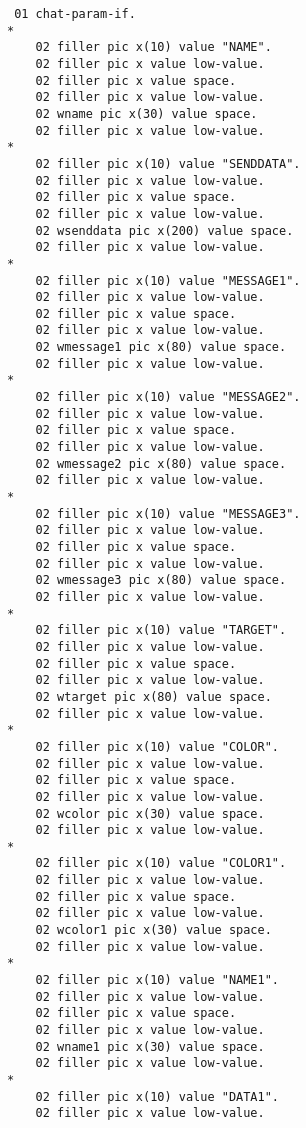 {{{\footnotesize
\begin{verbatim}
       01 chat-param-if.
      *
          02 filler pic x(10) value "NAME".
          02 filler pic x value low-value.
          02 filler pic x value space.
          02 filler pic x value low-value.
          02 wname pic x(30) value space.
          02 filler pic x value low-value.
      *    
          02 filler pic x(10) value "SENDDATA".
          02 filler pic x value low-value.
          02 filler pic x value space.
          02 filler pic x value low-value.
          02 wsenddata pic x(200) value space.
          02 filler pic x value low-value.
      *    
          02 filler pic x(10) value "MESSAGE1".
          02 filler pic x value low-value.
          02 filler pic x value space.
          02 filler pic x value low-value.
          02 wmessage1 pic x(80) value space.
          02 filler pic x value low-value.
      *    
          02 filler pic x(10) value "MESSAGE2".
          02 filler pic x value low-value.
          02 filler pic x value space.
          02 filler pic x value low-value.
          02 wmessage2 pic x(80) value space.
          02 filler pic x value low-value.
      *    
          02 filler pic x(10) value "MESSAGE3".
          02 filler pic x value low-value.
          02 filler pic x value space.
          02 filler pic x value low-value.
          02 wmessage3 pic x(80) value space.
          02 filler pic x value low-value.
      *    
          02 filler pic x(10) value "TARGET".
          02 filler pic x value low-value.
          02 filler pic x value space.
          02 filler pic x value low-value.
          02 wtarget pic x(80) value space.
          02 filler pic x value low-value.
      *   
          02 filler pic x(10) value "COLOR".
          02 filler pic x value low-value.
          02 filler pic x value space.
          02 filler pic x value low-value.
          02 wcolor pic x(30) value space.
          02 filler pic x value low-value.
      *    
          02 filler pic x(10) value "COLOR1".
          02 filler pic x value low-value.
          02 filler pic x value space.
          02 filler pic x value low-value.
          02 wcolor1 pic x(30) value space.
          02 filler pic x value low-value.
      *    
          02 filler pic x(10) value "NAME1".
          02 filler pic x value low-value.
          02 filler pic x value space.
          02 filler pic x value low-value.
          02 wname1 pic x(30) value space.
          02 filler pic x value low-value.
      *    
          02 filler pic x(10) value "DATA1".
          02 filler pic x value low-value.

\end{verbatim}}}}
